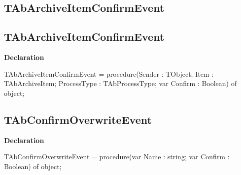 \documentclass{report}
\newif\ifpdf
\begin{document}
\subsection*{\large{\textbf{TAbArchiveItemConfirmEvent}}\normalsize\hspace{1ex}\hrulefill}
\else
\subsection*{TAbArchiveItemConfirmEvent}
\fi
\label{AbArcTyp-TAbArchiveItemConfirmEvent}
\begin{list}{}{
\setlength{\itemindent}{0cm}
\setlength{\listparindent}{0cm}
\setlength{\leftmargin}{\evensidemargin}
\addtolength{\leftmargin}{\tmplength}
\settowidth{\labelsep}{X}
\addtolength{\leftmargin}{\labelsep}
\setlength{\labelwidth}{\tmplength}
}
\item[\textbf{Declaration}\hfill]
\ifpdf
\begin{flushleft}
\fi
\begin{ttfamily}
TAbArchiveItemConfirmEvent = procedure(Sender : TObject; Item : TAbArchiveItem; ProcessType : TAbProcessType; var Confirm : Boolean) of object;\end{ttfamily}

\ifpdf
\end{flushleft}
\fi

\end{list}
\ifpdf
\subsection*{\large{\textbf{TAbConfirmOverwriteEvent}}\normalsize\hspace{1ex}\hrulefill}
\else
\subsection*{TAbConfirmOverwriteEvent}
\fi
\label{AbArcTyp-TAbConfirmOverwriteEvent}
\begin{list}{}{
\setlength{\itemindent}{0cm}
\setlength{\listparindent}{0cm}
\setlength{\leftmargin}{\evensidemargin}
\addtolength{\leftmargin}{\tmplength}
\settowidth{\labelsep}{X}
\addtolength{\leftmargin}{\labelsep}
\setlength{\labelwidth}{\tmplength}
}
\item[\textbf{Declaration}\hfill]
\ifpdf
\begin{flushleft}
\fi
\begin{ttfamily}
TAbConfirmOverwriteEvent = procedure(var Name : string; var Confirm : Boolean) of object;\end{ttfamily}

\ifpdf
\end{flushleft}
\fi

\end{list}
\ifpdf
\end{document}
